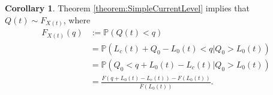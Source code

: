 \documentclass[a4paper]{thesis}
\theoremstyle{definition}
\newtheorem{corollary}{Corollary}[chapter]
\begin{document}
\begin{corollary}\label{corollary:SimpleFluidDistribution}
	Theorem \ref{theorem:SimpleCurrentLevel} implies that $Q(t)\sim F_{X(t)}$, where
	\begin{equation}\label{eq:SimpleCurrentDistribution}
	\begin{split}
	F_{X(t)}(q)&:=\mathbb{P}(Q(t)<q)\\
	&=\mathbb{P}(L_c(t)+Q_0-L_0(t)<q|Q_0>L_0(t))\\
	&=\mathbb{P}(Q_0<q+L_0(t)-L_c(t)|Q_0>L_0(t))\\
	&=\frac{F(q+L_0(t)-L_c(t))-F(L_0(t))}{\bar{F}(L_0(t))}.\\
	\end{split}
	\end{equation}
\end{corollary}
\end{document}
